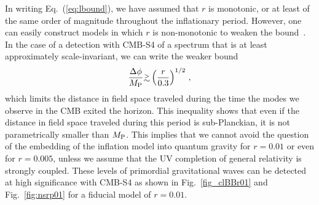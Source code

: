 In writing Eq.~(\ref{eq:lbound}), we have assumed that $r$ is monotonic, or at least of the same order of magnitude throughout the inflationary period. However, one can easily construct models in which $r$ is non-monotonic to weaken the bound~\cite{BenDayan:2009kv,Hotchkiss:2011gz, Chatterjee:2014hna}. In the case of a detection with CMB-S4 of a spectrum that is at least approximately scale-invariant, we can write the weaker bound
\begin{equation}
\frac{\Delta\phi}{M_{\rm P}}\gtrsim\left(\frac{r}{0.3}\right)^{1/2}\,,
\end{equation}
which limits the distance in field space traveled during the time the modes we observe in the CMB exited the horizon. This inequality shows that even if the distance in field space traveled during this period is sub-Planckian, it is not parametrically smaller than $M_{\rm P}$. 
This implies that we cannot avoid the question of the embedding of the inflation model into quantum gravity for $r=0.01$ or even for $r=0.005$, unless we assume that the UV completion of general relativity is strongly coupled. These levels of primordial gravitational waves can be detected at high significance with CMB-S4 as shown in Fig.~\ref{fig_clBBr01} and Fig.~\ref{fig:nsrp01} for a fiducial model of $r=0.01$.

